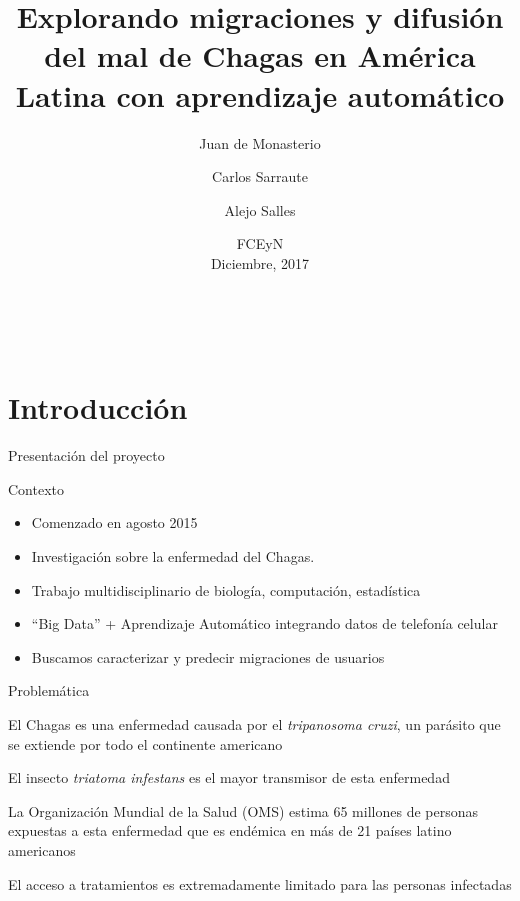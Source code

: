 \documentclass[xcolor=x11names]{beamer}
\title[Chagas \& Big Data]{Explorando migraciones y difusi\'on del mal de Chagas en América Latina con aprendizaje automático}
\author[Sarraute,Salles,de Monasterio]{Juan de Monasterio\inst{1}
  \and Carlos Sarraute\inst{3}
  \and Alejo Salles\inst{1}
  }
\institute[]{
  \and \inst{1} Universidad de Buenos Aires
  \and \inst{3} GranData Labs

  }
\date{ FCEyN \\ Diciembre, 2017}
\begin{document}
\begin{frame}
\titlepage\
\end{frame}


\section{Introducción}

\begin{frame}{Presentación  del proyecto}

	\begin{block}{Contexto}
		\begin{itemize}
			\item Comenzado en agosto 2015
			\item Investigación sobre la enfermedad del Chagas.
			\item Trabajo multidisciplinario de biología, computación, estadística
			\item ``Big Data'' + Aprendizaje Automático integrando datos de telefonía celular
			\item Buscamos caracterizar y predecir migraciones de usuarios
		\end{itemize}
	\end{block}


\end{frame}



\begin{frame}{Problemática}

			El Chagas es una enfermedad causada por el \textit{tripanosoma cruzi}, un parásito que se extiende por todo el continente americano

			\medskip  El insecto \textit{triatoma infestans} es el mayor transmisor de esta enfermedad

			\medskip  La Organización Mundial de la Salud (OMS) estima 65 millones de personas expuestas a esta enfermedad que es endémica en más de 21 países latino americanos

			\medskip El acceso a tratamientos es extremadamente limitado para las personas infectadas

\end{frame}
\end{document}
